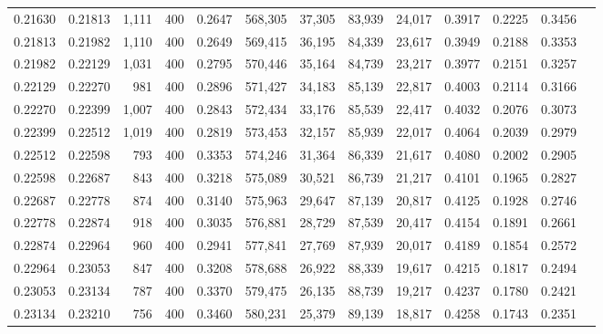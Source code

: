 \begin{tabular}{rrrrrrrrrrrrr}
0.21630 & 0.21813 &  1,111 &   400 &                                     0.2647 & 568,305 &  37,305 &  83,939 &  24,017 & 0.3917 & 0.2225 & 0.3456 \\
0.21813 & 0.21982 &  1,110 &   400 &                                     0.2649 & 569,415 &  36,195 &  84,339 &  23,617 & 0.3949 & 0.2188 & 0.3353 \\
0.21982 & 0.22129 &  1,031 &   400 &                                     0.2795 & 570,446 &  35,164 &  84,739 &  23,217 & 0.3977 & 0.2151 & 0.3257 \\
0.22129 & 0.22270 &    981 &   400 &                                     0.2896 & 571,427 &  34,183 &  85,139 &  22,817 & 0.4003 & 0.2114 & 0.3166 \\
0.22270 & 0.22399 &  1,007 &   400 &                                     0.2843 & 572,434 &  33,176 &  85,539 &  22,417 & 0.4032 & 0.2076 & 0.3073 \\
0.22399 & 0.22512 &  1,019 &   400 &                                     0.2819 & 573,453 &  32,157 &  85,939 &  22,017 & 0.4064 & 0.2039 & 0.2979 \\
0.22512 & 0.22598 &    793 &   400 &                                     0.3353 & 574,246 &  31,364 &  86,339 &  21,617 & 0.4080 & 0.2002 & 0.2905 \\
0.22598 & 0.22687 &    843 &   400 &                                     0.3218 & 575,089 &  30,521 &  86,739 &  21,217 & 0.4101 & 0.1965 & 0.2827 \\
0.22687 & 0.22778 &    874 &   400 &                                     0.3140 & 575,963 &  29,647 &  87,139 &  20,817 & 0.4125 & 0.1928 & 0.2746 \\
0.22778 & 0.22874 &    918 &   400 &                                     0.3035 & 576,881 &  28,729 &  87,539 &  20,417 & 0.4154 & 0.1891 & 0.2661 \\
0.22874 & 0.22964 &    960 &   400 &                                     0.2941 & 577,841 &  27,769 &  87,939 &  20,017 & 0.4189 & 0.1854 & 0.2572 \\
0.22964 & 0.23053 &    847 &   400 &                                     0.3208 & 578,688 &  26,922 &  88,339 &  19,617 & 0.4215 & 0.1817 & 0.2494 \\
0.23053 & 0.23134 &    787 &   400 &                                     0.3370 & 579,475 &  26,135 &  88,739 &  19,217 & 0.4237 & 0.1780 & 0.2421 \\
0.23134 & 0.23210 &    756 &   400 &                                     0.3460 & 580,231 &  25,379 &  89,139 &  18,817 & 0.4258 & 0.1743 & 0.2351 \\

\end{tabular}
